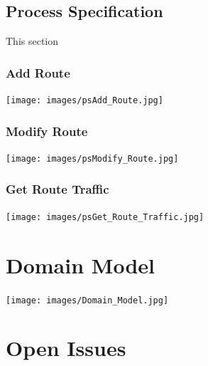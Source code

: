 \documentclass[a4paper,12pt]{article}
\begin{document}
\subsection{Process Specification}
This section
\subsubsection{Add Route}
\texttt{[image: images/psAdd\_Route.jpg]}
\subsubsection{Modify Route}
\texttt{[image: images/psModify\_Route.jpg]} 
\subsubsection{Get Route Traffic}
\texttt{[image: images/psGet\_Route\_Traffic.jpg]}

\section{Domain Model}
\texttt{[image: images/Domain\_Model.jpg]}
\section{Open Issues}
\end{document}
